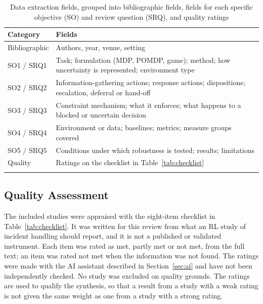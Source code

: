 \documentclass[pdflatex,sn-basic]{sn-jnl}
\begin{document}
\begin{table}[!htbp]
\caption{Data extraction fields, grouped into bibliographic fields, fields for each specific objective (SO) and review question (SRQ), and quality ratings}\label{tab:extraction}
\footnotesize
\begin{tabularx}{\textwidth}{@{}P{2.0cm}L@{}}
\toprule
Category & Fields \\
\midrule
Bibliographic & Authors, year, venue, setting \\
SO1 / SRQ1 & Task; formulation (MDP, POMDP, game); method; how uncertainty is represented; environment type \\
SO2 / SRQ2 & Information-gathering actions; response actions; dispositions; escalation, deferral or hand-off \\
SO3 / SRQ3 & Constraint mechanism; what it enforces; what happens to a blocked or uncertain decision \\
SO4 / SRQ4 & Environment or data; baselines; metrics; measure groups covered \\
SO5 / SRQ5 & Conditions under which robustness is tested; results; limitations \\
Quality & Ratings on the checklist in Table~\ref{tab:checklist} \\
\botrule
\end{tabularx}
\end{table}

\subsection{Quality Assessment}

The included studies were appraised with the eight-item checklist in Table~\ref{tab:checklist}. It was written for this review from what an RL study of incident handling should report, and it is not a published or validated instrument. Each item was rated as met, partly met or not met, from the full text; an item was rated not met when the information was not found. The ratings were made with the AI assistant described in Section~\ref{sec:ai} and have not been independently checked. No study was excluded on quality grounds. The ratings are used to qualify the synthesis, so that a result from a study with a weak rating is not given the same weight as one from a study with a strong rating.
\end{document}
